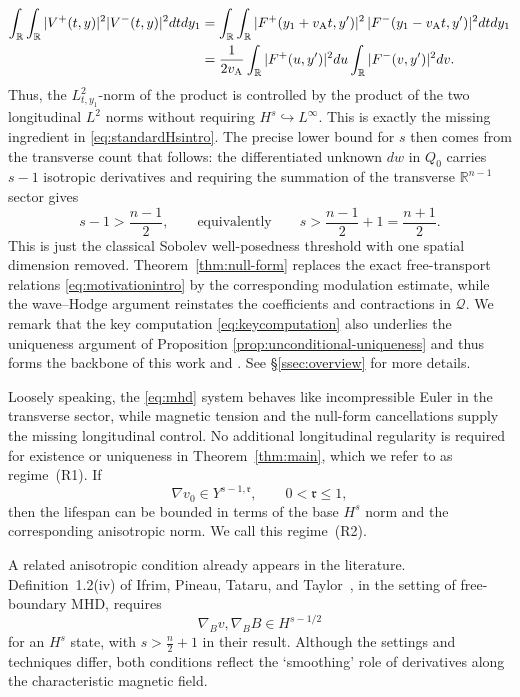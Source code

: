 \documentclass[11pt,reqno]{amsart}
\theoremstyle{plain}
\theoremstyle{definition}
\theoremstyle{remark}
\numberwithin{equation}{section}
\newcommand{\rpar}{\mathfrak r}
\newcommand{\Real}{\mathbb R}
\begin{document}
\begin{equation}\label{eq:keycomputation}
\begin{split}
    \int_\Real\int_\Real |V^+(t,y)|^2|V^-(t,y)|^2d td y_1 &=\int_{\Real}\int_{\Real}
 |F^+(y_1+v_{\rm A}t,y')|^2\,|F^-(y_1-v_{\rm A}t,y')|^2dtdy_1\\
 &=
 \frac1{2v_{\rm A}}
 \int_{\Real}|F^+(u,y')|^2du
 \int_{\Real}|F^-(v,y')|^2dv .
\end{split}
\end{equation}
Thus, the $L^2_{t,y_1}$-norm of the product is controlled by the product of
the two longitudinal $L^2$ norms without requiring $H^s\hookrightarrow L^\infty$. This is exactly the missing ingredient in \eqref{eq:standardHsintro}. The precise lower bound for $s$ then comes from the transverse count that follows: the differentiated unknown $dw$ in $Q_0$ carries $s-1$ isotropic derivatives
and requiring the summation of the transverse $\Real^{n-1}$ sector gives
\[
 s-1>\frac{n-1}{2},
 \qquad\text{equivalently}\qquad
 s>\frac{n-1}{2}+1=\frac{n+1}{2}.
\]
This is just the classical Sobolev well-posedness threshold with one
spatial dimension removed.  Theorem~\ref{thm:null-form} replaces the exact
free-transport relations \eqref{eq:motivationintro} by the corresponding
modulation estimate, while the wave--Hodge argument reinstates the
coefficients and contractions in $\mathcal Q$. We remark that the key computation \eqref{eq:keycomputation} also underlies the uniqueness argument of Proposition \ref{prop:unconditional-uniqueness} and thus forms the backbone of this work and \cite{Zhang2024}. See \S\ref{ssec:overview} for more details.

Loosely speaking, the \eqref{eq:mhd} system behaves like
incompressible Euler in the transverse sector, while magnetic tension and
the null-form cancellations supply the missing longitudinal control. 
No additional longitudinal regularity is required for existence or uniqueness
in Theorem~\ref{thm:main}, which we refer to as regime~\textup{(R1)}. If
\[
 \nabla v_0\in Y^{s-1,\rpar},
 \qquad 0<\rpar\leq1,
\]
then the lifespan can be bounded in terms of the base $H^s$ norm and the
corresponding anisotropic norm. We call this regime~\textup{(R2)}.

A related anisotropic condition already appears in the literature.
Definition~1.2(iv) of Ifrim, Pineau, Tataru, and Taylor~\cite{ifrim}, in the
setting of free-boundary MHD, requires
\[
 \nabla_Bv,\nabla_BB\in H^{s-1/2}
\]
for an $H^s$ state, with $s>\frac n2+1$ in their result.  Although the settings and techniques differ, both
conditions reflect the `smoothing' role of derivatives along the
characteristic magnetic field.
\end{document}
